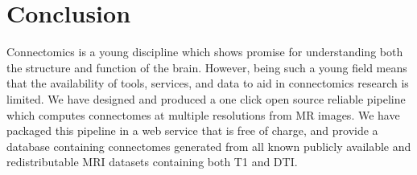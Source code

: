 \chapter{Conclusion}
Connectomics is a young discipline which shows promise for understanding both the structure and function of the brain. However, being such a young field means that the availability of tools, services, and data to aid in connectomics research is limited. We have designed and produced a one click open source reliable pipeline which computes connectomes at multiple resolutions from MR images. We have packaged this pipeline in a web service that is free of charge, and provide a database containing connectomes generated from all known publicly available and redistributable MRI datasets containing both T1 and DTI.

